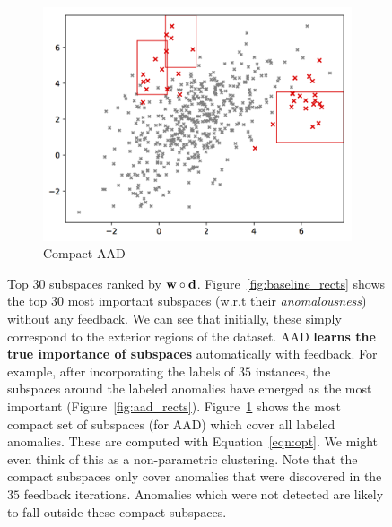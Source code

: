 \documentclass{article} %
\begin{document}
\begin{figure}
	\begin{subfigure}[b]{0.3\textwidth}
		\includegraphics[width=\textwidth]{top_30_anomalous_regions_100_trees_compact}
		\caption{Compact AAD}
		\label{fig:compact_rects}
	\end{subfigure}
	\caption{Top $30$ subspaces ranked by ${\bf w}\circ{\bf d}$. Figure~\ref{fig:baseline_rects} shows the top $30$ most important subspaces (w.r.t their \textit{anomalousness}) without any feedback. We can see that initially, these simply correspond to the exterior regions of the dataset. AAD \textbf{learns the true importance of subspaces} automatically with feedback. For example, after incorporating the labels of $35$ instances, the subspaces around the labeled anomalies have emerged as the most important (Figure~\ref{fig:aad_rects}). Figure~\ref{fig:compact_rects} shows the most compact set of subspaces (for AAD) which cover all labeled anomalies. These are computed with Equation~\ref{eqn:opt}. We might even think of this as a non-parametric clustering. Note that the compact subspaces only cover anomalies that were discovered in the $35$ feedback iterations. Anomalies which were not detected are likely to fall outside these compact subspaces.} \label{fig:rects}
\end{figure}
\end{document}
